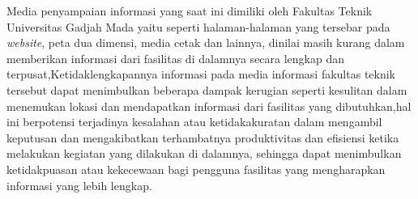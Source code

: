 Media penyampaian informasi yang saat ini dimiliki oleh Fakultas Teknik Universitas Gadjah Mada yaitu seperti halaman-halaman yang tersebar pada \emph{website}, 
peta dua dimensi, media cetak dan lainnya, dinilai masih kurang dalam memberikan
informasi dari fasilitas di dalamnya secara lengkap dan terpusat,Ketidaklengkapannya informasi pada 
media informasi fakultas teknik tersebut dapat menimbulkan beberapa dampak kerugian seperti kesulitan dalam menemukan
lokasi dan mendapatkan informasi dari fasilitas yang dibutuhkan,hal ini berpotensi terjadinya kesalahan atau 
ketidakakuratan dalam mengambil keputusan dan mengakibatkan terhambatnya produktivitas dan efisiensi 
ketika melakukan kegiatan yang dilakukan di dalamnya, sehingga dapat menimbulkan ketidakpuasan
atau kekecewaan bagi pengguna fasilitas yang mengharapkan informasi yang lebih lengkap.


	

	

	


	
		
